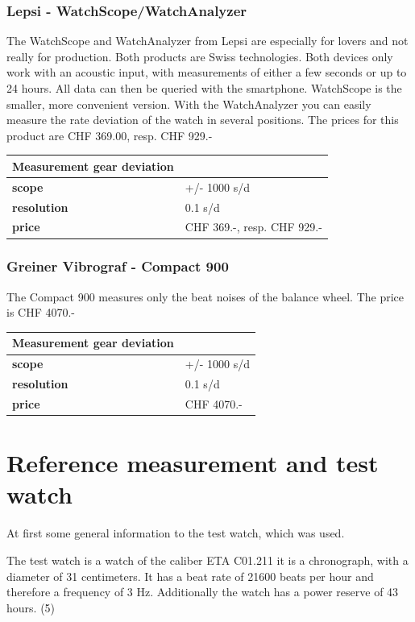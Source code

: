 \documentclass[12pt, a4paper]{report}
\begin{document}
\subsubsection{Lepsi - WatchScope/WatchAnalyzer}
The WatchScope and WatchAnalyzer from Lepsi are especially for lovers and not really for production. Both products are Swiss technologies. Both devices only work with an acoustic input, with measurements of either a few seconds or up to 24 hours. All data can then be queried with the smartphone. WatchScope is the smaller, more convenient version. With the WatchAnalyzer you can easily measure the rate deviation of the watch in several positions. The prices for this product are CHF 369.00, resp. CHF 929.-

\bigskip

\begin{tabularx}{\textwidth}{>{\bfseries}lX}
Measurement gear deviation & \\\toprule
scope & +/- 1000 s/d \\\midrule
resolution & 0.1 s/d\\\midrule
price & CHF 369.-, resp. CHF 929.-\\\bottomrule
\end{tabularx}


\subsubsection{Greiner Vibrograf - Compact 900}
The Compact 900 measures only the beat noises of the balance wheel. The price is CHF 4070.-

\bigskip

\begin{tabularx}{\textwidth}{>{\bfseries}lX}
Measurement gear deviation & \\\toprule
scope & +/- 1000 s/d \\\midrule
resolution & 0.1 s/d\\\midrule
price & CHF 4070.-\\\bottomrule
\end{tabularx}


\section{Reference measurement and test watch}
At first some general information to the test watch, which was used.

The test watch is a watch of the caliber ETA C01.211 it is a chronograph, with a diameter of 31 centimeters. It has a beat rate of 21600 beats per hour and therefore a frequency of 3 Hz. Additionally the watch has a power reserve of 43 hours. (5)
\end{document}
